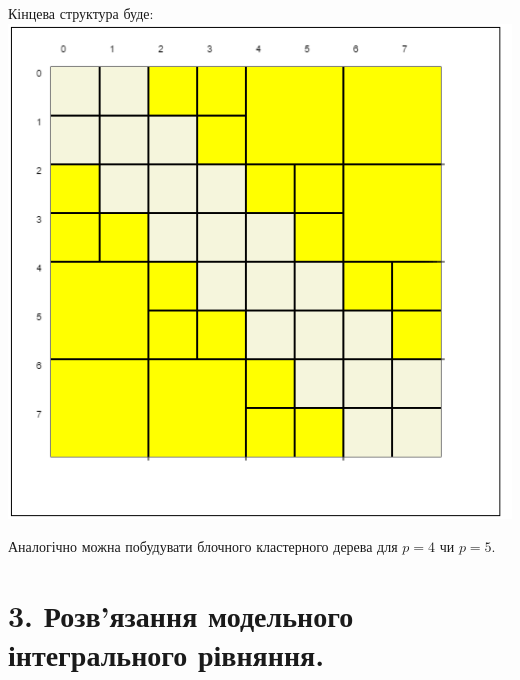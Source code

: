 \documentclass[12pt]{report}
\begin{document}
\begin{enumerate}
	Кінцева структура буде:
	\includegraphics[scale=0.5]{1_4}
	\end{enumerate}
	\par Аналогічно можна побудувати блочного кластерного дерева для $p=4$ чи $p=5$.
	\chapter{3. Розв'язання модельного інтегрального рівняння.}
\end{document}
